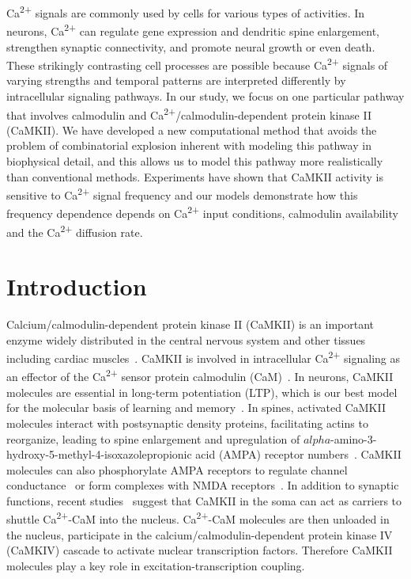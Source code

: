 \documentclass[10pt,letterpaper]{article}
\begin{document}
Ca\textsuperscript{2+} signals are commonly used by cells for various types of activities. In neurons, Ca\textsuperscript{2+} can regulate gene expression and dendritic spine enlargement, strengthen synaptic connectivity, and promote neural growth or even death. These strikingly contrasting cell processes are possible because Ca\textsuperscript{2+} signals of varying strengths and temporal patterns are interpreted differently by intracellular signaling pathways. In our study, we focus on one particular pathway that involves calmodulin and Ca\textsuperscript{2+}/calmodulin-dependent protein kinase II (CaMKII). We have developed a new computational method that avoids the problem of combinatorial explosion inherent with modeling this pathway in biophysical detail, and this allows us to model this pathway more realistically than conventional methods. Experiments have shown that CaMKII activity is sensitive to Ca\textsuperscript{2+} signal frequency and our models demonstrate how this frequency dependence depends on Ca\textsuperscript{2+} input conditions, calmodulin availability and the Ca\textsuperscript{2+} diffusion rate.

\linenumbers
\section*{Introduction}
Calcium/calmodulin-dependent protein kinase II (CaMKII) is an important enzyme widely distributed in the central nervous system and other tissues including cardiac muscles~\cite{Wayman:2008gla,Lisman:2002ki,Erickson:2014fs}. CaMKII is involved in intracellular Ca\textsuperscript{2+} signaling as an effector of the Ca\textsuperscript{2+} sensor protein calmodulin (CaM)~\cite{Herring:2016bh,Hell:2014bd,Coultrap:2012ip}. In neurons, CaMKII molecules are essential in long-term potentiation (LTP), which is our best model for the molecular basis of learning and memory~\cite{Bliss:1973jg}. In spines, activated CaMKII molecules interact with postsynaptic density proteins, facilitating actins to reorganize, leading to spine enlargement and upregulation of $alpha$-amino-3-hydroxy-5-methyl-4-isoxazolepropionic acid (AMPA) receptor numbers~\cite{Herring:2016bh}. CaMKII molecules can also phosphorylate AMPA receptors to regulate channel conductance~\cite{Herring:2016bh,Coultrap:2012ip} or form complexes with NMDA receptors~\cite{Hell:2014bd}. In addition to synaptic functions, recent studies~\cite{Ma:2014dr,Li:2016cq} suggest that CaMKII in the soma can act as carriers to shuttle Ca\textsuperscript{2+}-CaM into the nucleus. Ca\textsuperscript{2+}-CaM molecules are then unloaded in the nucleus, participate in the calcium/calmodulin-dependent protein kinase IV (CaMKIV) cascade to activate nuclear transcription factors. Therefore CaMKII molecules play a key role in excitation-transcription coupling. 
\end{document}
